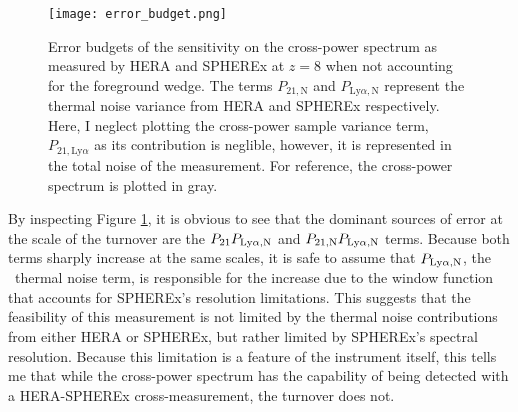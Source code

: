 \begin{figure}[th]
	\centering
	\texttt{[image: error\_budget.png]}
	\caption[Cross-Power Spectrum Error Budget]{Error budgets of the sensitivity on the cross-power spectrum as measured by HERA and SPHEREx
  at $z = 8$ when not accounting for the foreground wedge. The terms $P_{21, \textrm{N}}$ and $P_{\textrm{Ly}\alpha, \textrm{N}}$ represent the thermal noise variance from HERA and SPHEREx respectively. Here, I neglect plotting the cross-power sample variance term, $P_{21, \textrm{Ly}\alpha }$ as its contribution is neglible, however, it is represented in the total noise of the measurement. For reference, the cross-power spectrum is plotted in gray.}
	\label{fig:error_budget}
\end{figure}

By inspecting Figure \ref{fig:error_budget}, it is obvious to see that the dominant sources of error at the scale of the turnover are the $P_{21} P_{\rm Ly\alpha, N}$ and $P_{21,\rm N} P_{\rm Ly\alpha, N}$
terms. Because both terms sharply increase at the same scales, it is safe to assume
that $P_{\rm Ly\alpha, N}$, the \lya\ thermal noise term, is responsible for the
increase due to the window function that accounts for SPHEREx's resolution limitations.
This suggests that the feasibility of this measurement is not limited by the thermal
noise contributions from either HERA or SPHEREx, but rather limited by SPHEREx's spectral
resolution. Because this limitation is a feature of the instrument itself, this tells me that
while the cross-power spectrum has the capability of being detected with a HERA-SPHEREx
cross-measurement, the turnover does not.
